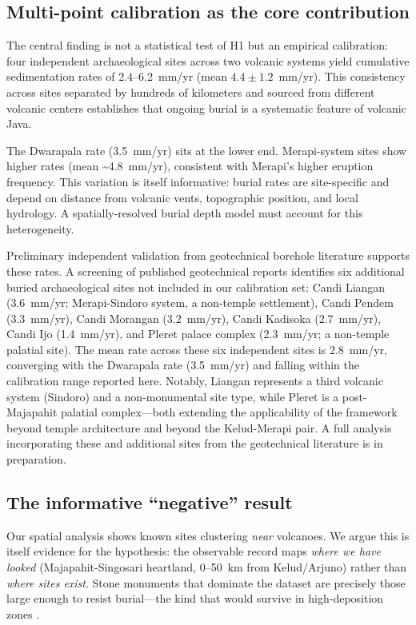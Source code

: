 \documentclass[12pt,a4paper]{article}
\begin{document}
\subsection{Multi-point calibration as the core contribution}

The central finding is not a statistical test of H1 but an empirical calibration: four independent archaeological sites across two volcanic systems yield cumulative sedimentation rates of 2.4--6.2~mm/yr (mean $4.4 \pm 1.2$~mm/yr). This consistency across sites separated by hundreds of kilometers and sourced from different volcanic centers establishes that ongoing burial is a systematic feature of volcanic Java.

The Dwarapala rate (3.5~mm/yr) sits at the lower end. Merapi-system sites show higher rates (mean \textasciitilde4.8~mm/yr), consistent with Merapi's higher eruption frequency. This variation is itself informative: burial rates are site-specific and depend on distance from volcanic vents, topographic position, and local hydrology. A spatially-resolved burial depth model must account for this heterogeneity.

Preliminary independent validation from geotechnical borehole literature supports these rates. A screening of published geotechnical reports identifies six additional buried archaeological sites not included in our calibration set: Candi Liangan (3.6~mm/yr; Merapi-Sindoro system, a non-temple settlement), Candi Pendem (3.3~mm/yr), Candi Morangan (3.2~mm/yr), Candi Kadisoka (2.7~mm/yr), Candi Ijo (1.4~mm/yr), and Pleret palace complex (2.3~mm/yr; a non-temple palatial site). The mean rate across these six independent sites is 2.8~mm/yr, converging with the Dwarapala rate (3.5~mm/yr) and falling within the calibration range reported here. Notably, Liangan represents a third volcanic system (Sindoro) and a non-monumental site type, while Pleret is a post-Majapahit palatial complex---both extending the applicability of the framework beyond temple architecture and beyond the Kelud-Merapi pair. A full analysis incorporating these and additional sites from the geotechnical literature is in preparation.

\subsection{The informative ``negative'' result}

Our spatial analysis shows known sites clustering \textit{near} volcanoes. We argue this is itself evidence for the hypothesis: the observable record maps \textit{where we have looked} (Majapahit-Singosari heartland, 0--50~km from Kelud/Arjuno) rather than \textit{where sites exist}. Stone monuments that dominate the dataset are precisely those large enough to resist burial---the kind that would survive in high-deposition zones \citep{verhagen2012}.
\end{document}
